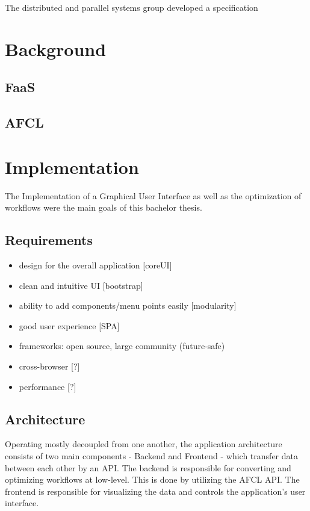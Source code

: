 \documentclass[a4paper,11pt,pdftex,halfparskip,cleardoubleempty,bibtotoc,liststotoc]{scrbook}
\begin{document}
The distributed and parallel systems group developed a specification 

\label{sec:introduction}

\chapter{Background}

\section{FaaS}
\section{AFCL}


\chapter{Implementation}
The Implementation of a Graphical User Interface as well as the optimization of workflows were the main goals of this bachelor thesis. 

\section{Requirements}

\begin{itemize}
	\item design for the overall application [coreUI]
	\item clean and intuitive UI [bootstrap]
	\item ability to add components/menu points easily [modularity]
	\item good user experience [SPA]
	\item frameworks: open source, large community (future-safe)
	\item cross-browser [?]
	\item performance [?]
\end{itemize}

\section{Architecture}

Operating mostly decoupled from one another, the application architecture consists of two main components - Backend and Frontend - which transfer data between each other by an API. The backend is responsible for converting and optimizing workflows at low-level. This is done by utilizing the AFCL API. The frontend is responsible for visualizing the data and controls the application's user interface.
\end{document}
